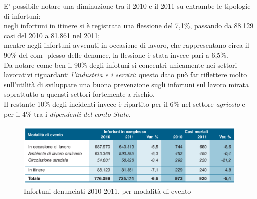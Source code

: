 E' possibile notare una diminuzione tra il 2010 e il 2011 su entrambe le tipologie di infortuni:\\
negli infortuni in itinere si è registrata una flessione del 7,1\%, passando da 88.129 casi del 2010 a 81.861 nel 2011;\\
mentre negli infortuni avvenuti in occasione di lavoro, che rappresentano circa il 90\% del com-
plesso delle denunce, la flessione è stata invece pari a 6,5\%.\\
Da notare come ben il 90\% degli infotuni si concentri unicamente nei settori lavorativi riguardanti \textit{l'industria e i servizi}: questo dato può far riflettere molto sull'utilità di sviluppare una buona prevenzione sugli infortuni sul lavoro mirata soprattutto a quensti settori fortemente a rischio.\\
Il restante 10\% degli incidenti invece è ripartito per il 6\% nel settore \textit{agricolo} e per il 4\% tra i \textit{dipendenti del conto Stato}.


\begin{figure}[H]
\centering
\includegraphics[scale=0.5]{images/cap4/analisiDiMercato/infortuniPerModalita}
\caption{Infortuni denunciati 2010-2011, per modalità di evento}
\end{figure}


